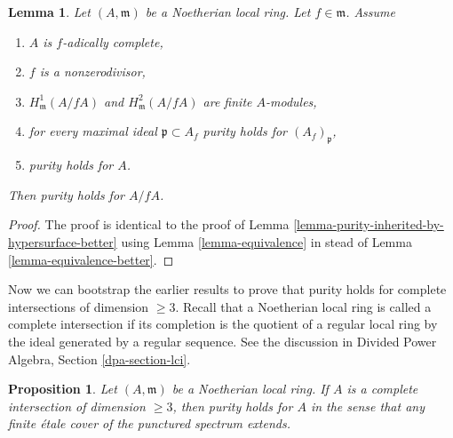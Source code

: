 \documentclass{stacks-project}
\theoremstyle{plain}
\newtheorem{proposition}[subsection]{Proposition}
\newtheorem{lemma}[subsection]{Lemma}
\theoremstyle{definition}
\theoremstyle{remark}
\numberwithin{equation}{subsection}
\begin{document}
\begin{lemma}
\label{lemma-purity-inherited-by-hypersurface}
Let $(A, \mathfrak m)$ be a Noetherian local ring.
Let $f \in \mathfrak m$. Assume
\begin{enumerate}
\item $A$ is $f$-adically complete,
\item $f$ is a nonzerodivisor,
\item $H^1_\mathfrak m(A/fA)$ and $H^2_\mathfrak m(A/fA)$ are finite
$A$-modules,
\item for every maximal ideal $\mathfrak p \subset A_f$
purity holds for $(A_f)_\mathfrak p$,
\item purity holds for $A$.
\end{enumerate}
Then purity holds for $A/fA$.
\end{lemma}

\begin{proof}
The proof is identical to the proof of
Lemma \ref{lemma-purity-inherited-by-hypersurface-better}
using
Lemma \ref{lemma-equivalence}
in stead of
Lemma \ref{lemma-equivalence-better}.
\end{proof}

\noindent
Now we can bootstrap the earlier results to prove that
purity holds for complete intersections of dimension $\geq 3$.
Recall that a Noetherian local ring is called a complete
intersection if its completion is the quotient of a
regular local ring by the ideal generated by a regular sequence.
See the discussion in Divided Power Algebra, Section \ref{dpa-section-lci}.

\begin{proposition}
\label{proposition-purity-complete-intersection}
Let $(A, \mathfrak m)$ be a Noetherian local ring. If $A$ is a
complete intersection of dimension $\geq 3$, then purity
holds for $A$ in the sense that any finite \'etale cover of
the punctured spectrum extends.
\end{proposition}
\end{document}
